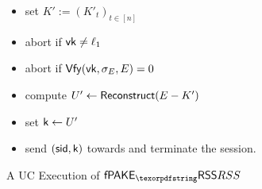 \begin{figure}[htbp]
\begin{fboxenv}
\begin{minipage}{0.95\textwidth}
\begin{enumerate}
        \begin{itemize}
         \item set $K':=(K'_t)_{t\in[n]}$
         \item abort if $\mathsf{vk}\neq\ell_1$
         \item abort if $\mathsf{Vfy}(\mathsf{vk},\sigma_E,E)=0$
         \item compute $U'\gets \mathsf{Reconstruct}(E-K')$
         \item set $\mathsf{k}\gets U'$
         \item send $(\mathsf{sid},\mathsf{k})$ towards \Env and terminate the session.
        \end{itemize}
       \end{enumerate}
    \end{minipage}
  \end{fboxenv}
  \caption{A UC Execution of $\PfakeRSS$}\label{fig:UC-FAKERSS}
\end{figure}

